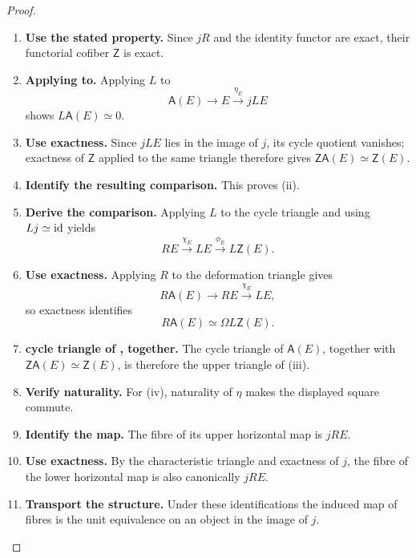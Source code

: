 \begin{proof}
\begin{enumerate}[label=\textup{(\arabic*)}]
    \item \textbf{Use the stated property.}
    Since \(jR\) and the identity functor are exact, their functorial cofiber \(\mathsf Z\)
    is exact.

    \item \textbf{Applying to.}
    Applying \(L\) to
    \[
            \mathsf A(E)\longrightarrow E\xrightarrow{\eta_E}jLE
        \]
    shows \(L\mathsf A(E)\simeq0\).

    \item \textbf{Use exactness.}
    Since \(jLE\) lies in the image of \(j\), its cycle quotient vanishes; exactness
    of \(\mathsf Z\) applied to the same triangle therefore gives \(\mathsf Z\mathsf A(E)\simeq\mathsf Z(E)\).

    \item \textbf{Identify the resulting comparison.}
    This proves \textup{(ii)}.

    \item \textbf{Derive the comparison.}
    Applying \(L\) to the cycle triangle and using \(Lj\simeq\operatorname{id}\) yields
    \[
            RE\xrightarrow{\chi_E}LE\xrightarrow{\phi_E}L\mathsf Z(E).
        \]

    \item \textbf{Use exactness.}
    Applying \(R\) to the deformation triangle gives
    \[
            R\mathsf A(E)\longrightarrow RE\xrightarrow{\chi_E}LE,
        \]
    so exactness identifies
    \[
            R\mathsf A(E)\simeq\Omega L\mathsf Z(E).
        \]

    \item \textbf{cycle triangle of , together.}
    The cycle triangle of \(\mathsf A(E)\), together with \(\mathsf Z\mathsf A(E)\simeq\mathsf Z(E)\), is therefore the upper
    triangle of \textup{(iii)}.

    \item \textbf{Verify naturality.}
    For \textup{(iv)}, naturality of \(\eta\) makes the displayed square commute.

    \item \textbf{Identify the map.}
    The fibre of its upper horizontal map is \(jRE\).

    \item \textbf{Use exactness.}
    By the characteristic triangle and exactness of \(j\), the fibre of the lower
    horizontal map is also canonically \(jRE\).

    \item \textbf{Transport the structure.}
    Under these identifications the induced map of fibres is the unit equivalence on an object
    in the image of \(j\).


\end{enumerate}
\end{proof}
